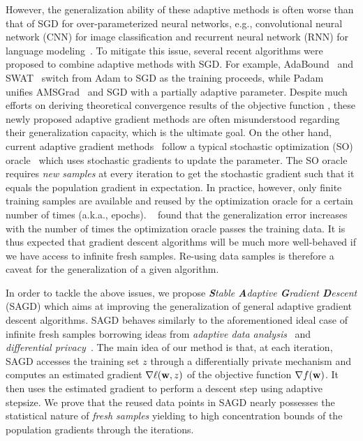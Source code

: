 \documentclass[11pt]{article}
\begin{document}
However, the generalization ability of these adaptive methods is often worse than that of SGD for over-parameterized neural networks, e.g., convolutional neural network (CNN) for image classification and recurrent neural network (RNN) for language modeling~\citep{wiro17}. 
To mitigate this issue, several recent algorithms were proposed to combine adaptive methods with SGD.
For example, AdaBound~\citep{luxi2019} and SWAT~\citep{keso2017} switch from Adam to SGD as the training proceeds, while Padam~\citep{chgu2018, zhta18} unifies AMSGrad~\citep{reka2018} and SGD with a partially adaptive parameter.  
Despite much efforts on deriving theoretical convergence results of the objective function \citep{zare18,wawu19, zosh2019, cheli2019}, these newly proposed adaptive gradient methods are often misunderstood regarding their generalization capacity, which is the ultimate goal.
On the other hand, current adaptive gradient methods~\citep{duha11,kiba15,tige12, reka2018, wawu19} follow a typical stochastic optimization (SO) oracle~\citep{romo51, ghla2013} which uses stochastic gradients to update the parameter. The SO oracle requires \emph{new samples} at every iteration to get the stochastic gradient such that it equals the population gradient in expectation. In practice, however, only finite training samples are available and reused by the optimization oracle for a certain number of times (a.k.a., epochs). 
~\citet{hare2016} found that the generalization error increases with the number of times the optimization oracle passes the training data. 
It is thus expected that gradient descent algorithms will be much more well-behaved if we have access to infinite fresh samples. 
Re-using data samples is therefore a caveat for the generalization of a given algorithm.

In order to tackle the above issues, we propose \textit{\textbf{S}table \textbf{A}daptive \textbf{G}radient \textbf{D}escent} (\textsc{SAGD}) which aims at improving the generalization of general adaptive gradient descent algorithms.
\textsc{SAGD} behaves similarly to the aforementioned ideal case of infinite fresh samples borrowing ideas from \emph{adaptive data analysis}~\citep{dwfe15} and \emph{differential privacy}~\citep{dwro2014}. 
The main idea of our method is that, at each iteration, \textsc{SAGD} accesses the training set $z$ through a differentially private mechanism and computes an estimated gradient $\nabla \ell(\mathbf{w},z)$ of the objective function $\nabla f(\mathbf{w})$. 
It then uses the estimated gradient to perform a descent step using adaptive stepsize. 
We prove that the reused data points in \textsc{SAGD} nearly possesses the statistical nature of \emph{fresh samples} yielding to high concentration bounds of the population gradients through the iterations.
\end{document}
